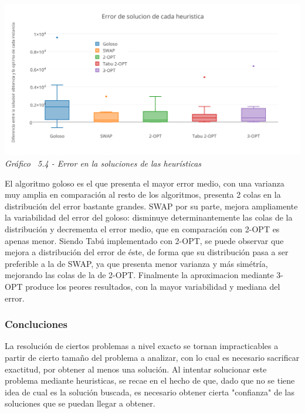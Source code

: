 	\vspace*{0.3cm} \vspace*{0.3cm}
  \begin{center}
 \includegraphics[scale=0.5]{./EJ5/errorporalgoritmo.png}\\
 {\textit{Gráfico \ 5.4 - Error en la soluciones de las heur\'isticas}}
  \end{center}
  \vspace*{0.3cm}
	
El algoritmo goloso es el que presenta el mayor error medio, con una varianza muy amplia en comparación al resto de los algoritmos, presenta 2 colas en la distribución del error bastante grandes. SWAP por su parte, mejora ampliamente la variabilidad del error del goloso: disminuye determinantemente las colas de la distribución y decrementa el error medio, que en comparación con 2-OPT es apenas menor. Siendo Tabú implementado con 2-OPT, se puede observar que mejora a distribución del error de éste, de forma que su distribución pasa a ser preferible a la de SWAP, ya que presenta menor varianza y más simétría, mejorando las colas de la de 2-OPT. Finalmente la aproximacion mediante 3-OPT produce los peores resultados, con la mayor variabilidad y mediana del error.


\subsubsection{Concluciones}

La resolución de ciertos problemas a nivel exacto se tornan impracticables a partir de cierto tamaño del problema a analizar, con lo cual es necesario sacrificar exactitud, por obtener al menos una solución. Al intentar solucionar este problema mediante heuristicas, se recae en el hecho de que, dado que no se tiene idea de cual es la solución buscada, es necesario obtener cierta "confianza" de las soluciones que se puedan llegar a obtener.

